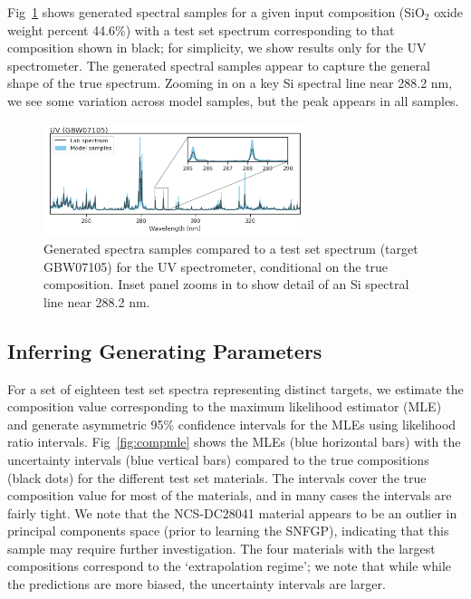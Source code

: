 \documentclass[letterpaper]{article} %
\begin{document}
Fig~\ref{fig:genspectra} shows generated spectral samples for a given input composition (SiO$_2$ oxide weight percent 44.6\%) with a test set spectrum corresponding to that composition shown in black; for simplicity, we show results only for the UV spectrometer.
The generated spectral samples appear to capture the general shape of the true spectrum.
Zooming in on a key Si spectral line near 288.2 nm, we see some variation across model samples, but the peak appears in all samples.

\begin{figure}
\centering
\includegraphics[width=0.9\linewidth,height=1.3in ]{figures/uvspectra.png}
\caption{Generated spectra samples compared to a test set spectrum (target GBW07105) for the UV spectrometer, conditional on the true composition. Inset panel zooms in to show detail of an Si spectral line near 288.2 nm.}
\label{fig:genspectra}
\end{figure}

\vspace{-1.78mm}
\subsection{Inferring Generating Parameters}
For a set of eighteen test set spectra representing distinct targets, we estimate the composition value corresponding to the maximum likelihood estimator (MLE) and generate asymmetric 95\% confidence intervals for the MLEs using likelihood ratio intervals.
Fig~\ref{fig:compmle} shows the MLEs (blue horizontal bars) with the uncertainty intervals (blue vertical bars) compared to the true compositions (black dots) for the different test set materials.
The intervals cover the true composition value for most of the materials, and in many cases the intervals are fairly tight.
We note that the NCS-DC28041 material appears to be an outlier in principal components space (prior to learning the SNFGP), indicating that this sample may require further investigation.
The four materials with the largest compositions correspond to the `extrapolation regime'; we note that while while the predictions are more biased, the uncertainty intervals are larger.
\end{document}
